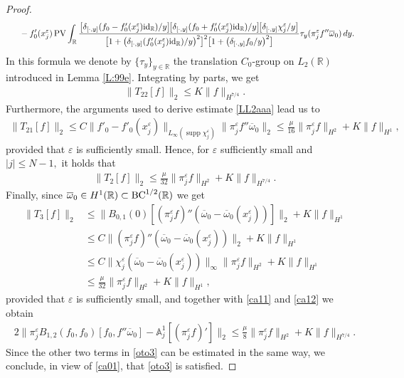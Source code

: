 \documentclass[11pt,reqno]{amsart}
\numberwithin{equation}{section}
\newcommand{\PV}{\mathop{\rm PV}\nolimits}
\newcommand{\0}{\Omega}
\newcommand{\e}{\varepsilon}
\newcommand{\ov}{\overline}
\newcommand{\oo}{\ov\omega}
\newcommand{\bA}{\mathbb{A}}
\newcommand{\R}{\mathbb{R}}
\DeclareMathOperator{\supp}{supp}
\numberwithin{equation}{section}
\begin{document}
\begin{proof}
\begin{align*}
  &\hspace{0.424cm} \phantom{:}-f_0'(x_j^\e)\PV\int_\R\frac{\big[\delta_{[\cdot,y]}(f_0- f_0'(x_j^\e){\rm id}_{\R})/y\big]\!\big[\delta_{[\cdot,y]}(f_0+f_0'(x_j^\e){\rm id}_{\R})/y\big]\!
  \big[\delta_{[\cdot,y]}\chi_j^\e/y \big]}{\big[1+\big(\delta_{[\cdot,y]}(f_0'(x_j^\e){\rm id}_{\R})/y\big)^2\big]^2
  \big[1+\big(\delta_{[\cdot,y]}f_0/y\big)^2\big]} \tau_y (\pi_j^\e f''\oo_0) \, dy.
 \end{align*}
 In this formula we denote by $\{\tau_y\}_{y\in\R}$ the   translation $C_0$-group on $L_2(\R)$ introduced in Lemma \ref{L:99e}.  
 Integrating by parts, we get
 \begin{align*}
 \|T_{22}[f]\|_2\leq K\|f\|_{H^{7/4}}.
\end{align*}
Furthermore,   the arguments used to derive  estimate \eqref{LL2aaa} lead us to 
 \begin{align*} 
 \|T_{21}[f]\|_2\leq C\|f'_0-f'_0(x_j^\e)\|_{L_\infty(\supp\chi_j^\e)}\|\pi_j^\e f''\oo_0\|_2\leq \frac{\mu}{16}  \|\pi_j^\e f\|_{H^2}+K\|  f\|_{H^{1}},
\end{align*} 
provided that $\e$ is sufficiently small.
Hence,  for $\e$ sufficiently small and $|j|\leq N-1,$ it holds that
 \begin{align}\label{ca12}
 \|T_{2}[f]\|_2\leq   \frac{\mu}{32}  \|\pi_j^\e f\|_{H^2}+K\|  f\|_{H^{7/4}}.
\end{align}
Finally, since $\oo_0\in H^1(\R)\subset {\rm BC}^{1/2}(\R)$  we get 
\begin{align*}
 \|T_3[f]\|_2&\leq \|B_{0,1}(0)[(\pi_j^\e f)''(\oo_0-\oo_0(x_j^\e))]\|_2+K\|f\|_{H^1}\nonumber\\[1ex]
 &\leq C\|(\pi_j^\e f)''(\oo_0-\oo_0(x_j^\e))\|_2+K\|f\|_{H^1}\nonumber\\[1ex]
  &\leq C \|\chi_j^\e(\oo_0-\oo_0(x_j^\e))\|_\infty\|\pi_j^\e f\|_{H^2}+K\|f\|_{H^1}\nonumber\\[1ex]
  &\leq  \frac{\mu}{32}\|\pi_j^\e f\|_{H^2}+K\|f\|_{H^1},
\end{align*}
provided that  $\e$ is sufficiently small, and together with  \eqref{ca11} and  \eqref{ca12} we obtain 
\begin{align*}
 2\|\pi_j^\e B_{1,2}( f_0, f_0)[ f_0,f''\oo_0]-\bA_{j}^1[(\pi^\e_j f)']\|_{2}\leq \frac{\mu}{8} \|\pi_j^\e f\|_{H^2}+K\|f\|_{H^{7/4}}.
\end{align*}
Since the other two terms in \eqref{oto3} can be estimated in the same way, we conclude, in view of \eqref{ca01}, that  \eqref{oto3} is satisfied. 
\medskip
 

\end{proof}
\end{document}
